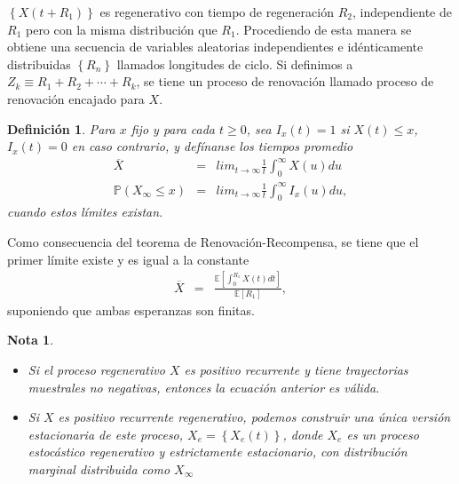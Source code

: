 \documentclass{article}
\newtheorem{Def}{Definición}[section]
\newtheorem{Note}{Nota}[section]
\newcommand{\esp}{\mathbb{E}}
\newcommand{\prob}{\mathbb{P}}
\numberwithin{equation}{section}
\begin{document}
$\left\{X\left(t+R_{1}\right)\right\}$ es regenerativo con tiempo de regeneraci\'on $R_{2}$, independiente de $R_{1}$ pero con la misma distribuci\'on que $R_{1}$. Procediendo de esta manera se obtiene una secuencia de variables aleatorias independientes e id\'enticamente distribuidas $\left\{R_{n}\right\}$ llamados longitudes de ciclo. Si definimos a $Z_{k}\equiv R_{1}+R_{2}+\cdots+R_{k}$, se tiene un proceso de renovaci\'on llamado proceso de renovaci\'on encajado para $X$.




\begin{Def}
Para $x$ fijo y para cada $t\geq0$, sea $I_{x}\left(t\right)=1$ si $X\left(t\right)\leq x$,  $I_{x}\left(t\right)=0$ en caso contrario, y def\'inanse los tiempos promedio
\begin{eqnarray*}
\overline{X}&=&lim_{t\rightarrow\infty}\frac{1}{t}\int_{0}^{\infty}X\left(u\right)du\\
\prob\left(X_{\infty}\leq x\right)&=&lim_{t\rightarrow\infty}\frac{1}{t}\int_{0}^{\infty}I_{x}\left(u\right)du,
\end{eqnarray*}
cuando estos l\'imites existan.
\end{Def}

Como consecuencia del teorema de Renovaci\'on-Recompensa, se tiene que el primer l\'imite  existe y es igual a la constante
\begin{eqnarray*}
\overline{X}&=&\frac{\esp\left[\int_{0}^{R_{1}}X\left(t\right)dt\right]}{\esp\left[R_{1}\right]},
\end{eqnarray*}
suponiendo que ambas esperanzas son finitas.

\begin{Note}
\begin{itemize}
\item[a)] Si el proceso regenerativo $X$ es positivo recurrente y tiene trayectorias muestrales no negativas, entonces la ecuaci\'on anterior es v\'alida.
\item[b)] Si $X$ es positivo recurrente regenerativo, podemos construir una \'unica versi\'on estacionaria de este proceso, $X_{e}=\left\{X_{e}\left(t\right)\right\}$, donde $X_{e}$ es un proceso estoc\'astico regenerativo y estrictamente estacionario, con distribuci\'on marginal distribuida como $X_{\infty}$
\end{itemize}
\end{Note}

\end{document}
